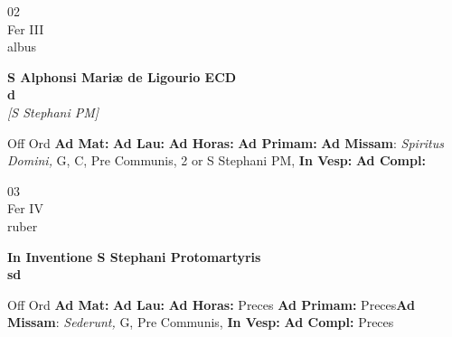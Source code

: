 \documentclass[10pt, openany]{book}
\begin{document}
    \begin{center}
        \begin{minipage}{3.5in}
            \vspace{2em}
            \begin{minipage}{0.5in}
                {\Huge 02} \\
                {\normalsize Fer III} \\
                {\normalsize albus}
            \end{minipage}
            \begin{minipage}{3.0in}
                \textbf{ \large S Alphonsi Mariæ de Ligourio ECD \\
                \textnormal{\normalsize d}} \\ \textit{[S Stephani PM]} \\ 
            \end{minipage}
            \begin{justify}Off Ord
                \textbf{Ad Mat: }
                \textbf{Ad Lau: }
                \textbf{Ad Horas: }
                \textbf{Ad Primam: }\textbf{Ad Missam}: \textit{Spiritus Domini,} G, C, Pre Communis, 2 or S Stephani PM,  
                \textbf{In Vesp: }
                \textbf{Ad Compl: }
            \end{justify}
        \end{minipage}
    \end{center}

    \begin{center}
        \begin{minipage}{3.5in}
            \vspace{2em}
            \begin{minipage}{0.5in}
                {\Huge 03} \\
                {\normalsize Fer IV} \\
                {\normalsize ruber}
            \end{minipage}
            \begin{minipage}{3.0in}
                \textbf{ \large In Inventione S Stephani Protomartyris \\
                \textnormal{\normalsize sd}} \\ 
            \end{minipage}
            \begin{justify}Off Ord
                \textbf{Ad Mat: }
                \textbf{Ad Lau: }
                \textbf{Ad Horas: }Preces
                \textbf{Ad Primam: }Preces\textbf{Ad Missam}: \textit{Sederunt,} G, Pre Communis,  
                \textbf{In Vesp: }
                \textbf{Ad Compl: }Preces
            \end{justify}
        \end{minipage}
    \end{center}
\end{document}
